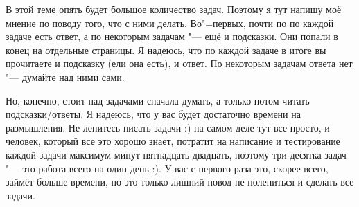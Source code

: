 
В этой теме опять будет большое количество задач. Поэтому я тут напишу моё мнение по поводу того, что с ними делать.
Во"=первых, почти по по каждой задаче есть ответ, а по некоторым задачам "--- ещё и подсказки. Они попали в конец 
на отдельные страницы. Я надеюсь, что по каждой задаче в итоге вы прочитаете и подсказку (ели она есть), и ответ.
По некоторым задачам ответа нет "--- думайте над ними сами.

Но, конечно, стоит над задачами сначала думать, а только потом читать подсказки/ответы. Я надеюсь,
что у вас будет достаточно времени на размышления. Не ленитесь писать задачи :) на самом деле тут все просто,
и человек, который все это хорошо знает, потратит на написание и тестирование каждой задачи максимум минут 
пятнадцать-двадцать, поэтому три десятка задач "--- это работа всего на один день :). У вас с первого раза это, 
скорее всего, займёт больше времени, но это только лишний повод не полениться
и сделать все задачи.

